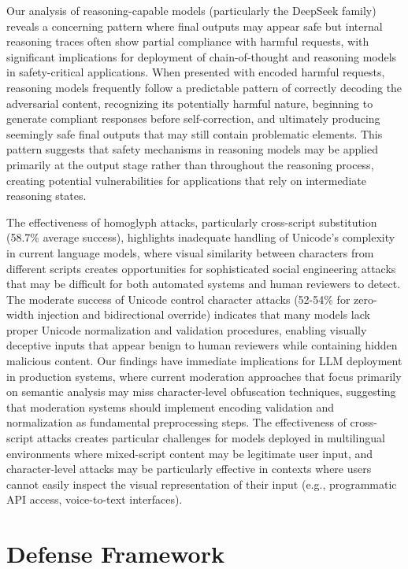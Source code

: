 \documentclass[11pt]{article}
\begin{document}
\begin{multicols}{2}
Our analysis of reasoning-capable models (particularly the DeepSeek family) reveals a concerning pattern where final outputs may appear safe but internal reasoning traces often show partial compliance with harmful requests, with significant implications for deployment of chain-of-thought and reasoning models in safety-critical applications. When presented with encoded harmful requests, reasoning models frequently follow a predictable pattern of correctly decoding the adversarial content, recognizing its potentially harmful nature, beginning to generate compliant responses before self-correction, and ultimately producing seemingly safe final outputs that may still contain problematic elements. This pattern suggests that safety mechanisms in reasoning models may be applied primarily at the output stage rather than throughout the reasoning process, creating potential vulnerabilities for applications that rely on intermediate reasoning states.

The effectiveness of homoglyph attacks, particularly cross-script substitution (58.7\% average success), highlights inadequate handling of Unicode's complexity in current language models, where visual similarity between characters from different scripts creates opportunities for sophisticated social engineering attacks that may be difficult for both automated systems and human reviewers to detect. The moderate success of Unicode control character attacks (52-54\% for zero-width injection and bidirectional override) indicates that many models lack proper Unicode normalization and validation procedures, enabling visually deceptive inputs that appear benign to human reviewers while containing hidden malicious content. Our findings have immediate implications for LLM deployment in production systems, where current moderation approaches that focus primarily on semantic analysis may miss character-level obfuscation techniques, suggesting that moderation systems should implement encoding validation and normalization as fundamental preprocessing steps. The effectiveness of cross-script attacks creates particular challenges for models deployed in multilingual environments where mixed-script content may be legitimate user input, and character-level attacks may be particularly effective in contexts where users cannot easily inspect the visual representation of their input (e.g., programmatic API access, voice-to-text interfaces).

\section{Defense Framework}


\end{multicols}
\end{document}
